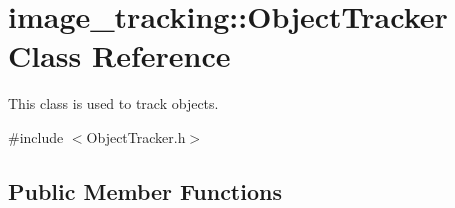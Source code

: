 \hypertarget{classimage__tracking_1_1_object_tracker}{}\section{image\+\_\+tracking\+:\+:Object\+Tracker Class Reference}
\label{classimage__tracking_1_1_object_tracker}


This class is used to track objects.  




{\ttfamily \#include $<$Object\+Tracker.\+h$>$}

\subsection*{Public Member Functions}
